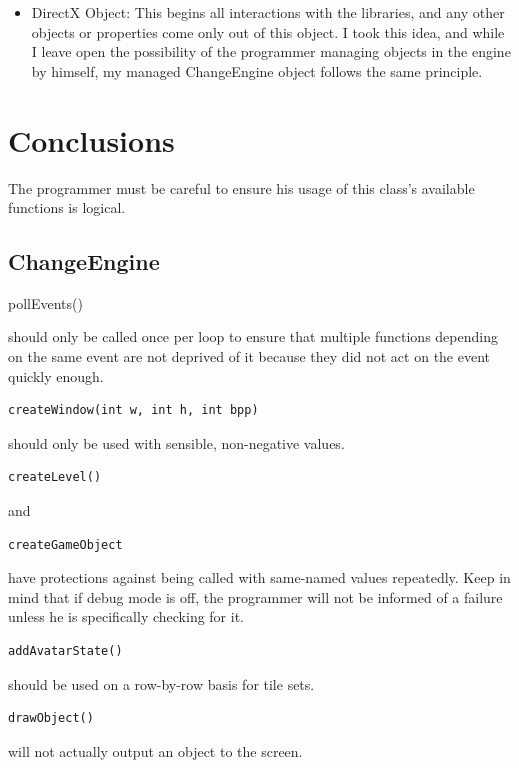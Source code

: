 \documentclass[12pt]{article}
\begin{document}
\begin{itemize}
 \item DirectX Object: This begins all interactions with the libraries, and any other objects or properties come only out of this object. I took this idea, and while I leave open the possibility of the programmer managing objects in the engine by himself, my managed ChangeEngine object follows the same principle.
\end{itemize}


  \section{Conclusions}
    The programmer must be careful to ensure his usage of this class's available functions is logical.
\subsection{ChangeEngine}
\begin{verbatim*}pollEvents()\end{verbatim*} should only be called once per loop to ensure that multiple functions depending on the same event are not deprived of it because they did not act on the event quickly enough.
\\

\begin{verbatim}createWindow(int w, int h, int bpp)\end{verbatim} should only be used with sensible, non-negative values.
\\

\begin{verbatim}createLevel()\end{verbatim} and \begin{verbatim}createGameObject\end{verbatim} have protections against being called with same-named values repeatedly. Keep in mind that if debug mode is off, the programmer will not be informed of a failure unless he is specifically checking for it.
\\

\begin{verbatim}addAvatarState()\end{verbatim} should be used on a row-by-row basis for tile sets.
\\

\begin{verbatim}drawObject()\end{verbatim} will not actually output an object to the screen.
\\
\end{document}
